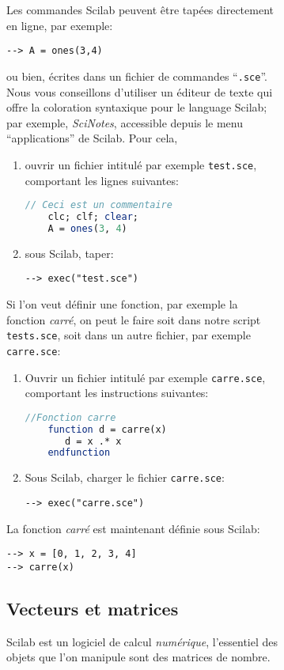 \documentclass[a4paper,11pt]{article}
\begin{document}
\begin{figure}
\begin{figure}
Les commandes Scilab peuvent être tapées directement en ligne, par
exemple:
\begin{verbatim}
--> A = ones(3,4)
\end{verbatim}
ou bien, écrites dans un fichier de commandes ``{\tt *.sce}''. Nous
vous conseillons d'utiliser un éditeur de texte qui offre la
coloration syntaxique pour le language Scilab; par exemple, {\it
  SciNotes}, accessible depuis le menu ``applications'' de
Scilab. Pour cela,
\begin{enumerate}
\item ouvrir un fichier intitulé par exemple {\tt test.sce},
  comportant les lignes suivantes:
  \begin{lstlisting}[language=scilab]
    // Ceci est un commentaire
    clc; clf; clear;
    A = ones(3, 4)
  \end{lstlisting}
\item sous Scilab, taper:
\begin{verbatim}
--> exec("test.sce")
\end{verbatim}
\end{enumerate}

Si l'on veut définir une fonction, par exemple la fonction {\it carré},
on peut le faire soit dans notre script {\tt tests.sce}, soit dans un
autre fichier, par exemple {\tt carre.sce}:
\begin{enumerate}
\item Ouvrir un fichier intitulé par exemple {\tt carre.sce},
  comportant les instructions suivantes:
  \begin{lstlisting}[language=scilab]
    //Fonction carre
    function d = carre(x)
       d = x .* x
    endfunction
  \end{lstlisting}

\item Sous Scilab, charger le fichier {\tt carre.sce}:
\begin{verbatim}
--> exec("carre.sce")
\end{verbatim}
\end{enumerate}
La fonction {\it carré} est maintenant définie sous Scilab:
\begin{verbatim}
--> x = [0, 1, 2, 3, 4]
--> carre(x)
\end{verbatim}

\subsection{Vecteurs et matrices}

Scilab est un logiciel de calcul \emph{numérique}, l'essentiel des objets que l'on manipule sont des matrices de nombre.


\end{figure}
\end{figure}
\end{document}
